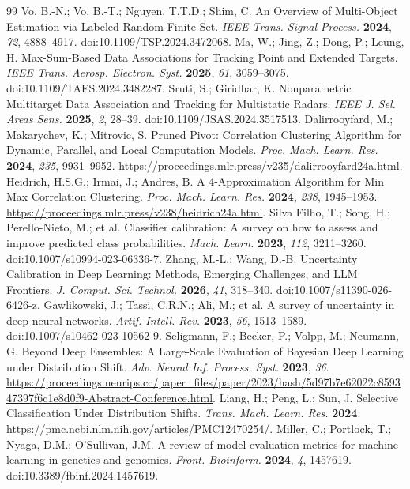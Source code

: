 \begin{thebibliography}{99}
 Vo, B.-N.; Vo, B.-T.; Nguyen, T.T.D.; Shim, C. An Overview of Multi-Object Estimation via Labeled Random Finite Set. \emph{IEEE Trans. Signal Process.} \textbf{2024}, \emph{72}, 4888--4917. doi:10.1109/TSP.2024.3472068.
 Ma, W.; Jing, Z.; Dong, P.; Leung, H. Max-Sum-Based Data Associations for Tracking Point and Extended Targets. \emph{IEEE Trans. Aerosp. Electron. Syst.} \textbf{2025}, \emph{61}, 3059--3075. doi:10.1109/TAES.2024.3482287.
 Sruti, S.; Giridhar, K. Nonparametric Multitarget Data Association and Tracking for Multistatic Radars. \emph{IEEE J. Sel. Areas Sens.} \textbf{2025}, \emph{2}, 28--39. doi:10.1109/JSAS.2024.3517513.
 Dalirrooyfard, M.; Makarychev, K.; Mitrovic, S. Pruned Pivot: Correlation Clustering Algorithm for Dynamic, Parallel, and Local Computation Models. \emph{Proc. Mach. Learn. Res.} \textbf{2024}, \emph{235}, 9931--9952. \url{https://proceedings.mlr.press/v235/dalirrooyfard24a.html}.
 Heidrich, H.S.G.; Irmai, J.; Andres, B. A 4-Approximation Algorithm for Min Max Correlation Clustering. \emph{Proc. Mach. Learn. Res.} \textbf{2024}, \emph{238}, 1945--1953. \url{https://proceedings.mlr.press/v238/heidrich24a.html}.
 Silva Filho, T.; Song, H.; Perello-Nieto, M.; et al. Classifier calibration: A survey on how to assess and improve predicted class probabilities. \emph{Mach. Learn.} \textbf{2023}, \emph{112}, 3211--3260. doi:10.1007/s10994-023-06336-7.
 Zhang, M.-L.; Wang, D.-B. Uncertainty Calibration in Deep Learning: Methods, Emerging Challenges, and LLM Frontiers. \emph{J. Comput. Sci. Technol.} \textbf{2026}, \emph{41}, 318--340. doi:10.1007/s11390-026-6426-z.
 Gawlikowski, J.; Tassi, C.R.N.; Ali, M.; et al. A survey of uncertainty in deep neural networks. \emph{Artif. Intell. Rev.} \textbf{2023}, \emph{56}, 1513--1589. doi:10.1007/s10462-023-10562-9.
 Seligmann, F.; Becker, P.; Volpp, M.; Neumann, G. Beyond Deep Ensembles: A Large-Scale Evaluation of Bayesian Deep Learning under Distribution Shift. \emph{Adv. Neural Inf. Process. Syst.} \textbf{2023}, \emph{36}. \url{https://proceedings.neurips.cc/paper_files/paper/2023/hash/5d97b7e62022c859347397f6c1e8d0f9-Abstract-Conference.html}.
 Liang, H.; Peng, L.; Sun, J. Selective Classification Under Distribution Shifts. \emph{Trans. Mach. Learn. Res.} \textbf{2024}. \url{https://pmc.ncbi.nlm.nih.gov/articles/PMC12470254/}.
 Miller, C.; Portlock, T.; Nyaga, D.M.; O'Sullivan, J.M. A review of model evaluation metrics for machine learning in genetics and genomics. \emph{Front. Bioinform.} \textbf{2024}, \emph{4}, 1457619. doi:10.3389/fbinf.2024.1457619.

\end{thebibliography}
